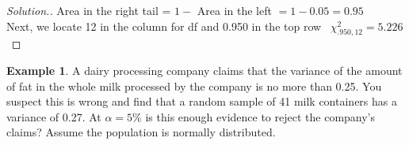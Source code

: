 \documentclass[11pt,a4paper]{article}
\theoremstyle{definition}
\newtheorem{example}[thm]{Example}
\newenvironment{solution}
  {\renewcommand{\qedsymbol}{}\begin{proof}[\textit{Solution}.]}
  {\end{proof}}
\begin{document}
\begin{solution}
Area in the right tail = $1 - $ Area in the left $= 1 - 0.05=0.95$\\

Next, we locate 12 in the column for df and 0.950 in the top row \ $\chi^2_{.950,12}=5.226$\\[1ex]
\end{solution}











\begin{example}
A dairy processing company claims that the variance of the amount of fat in the whole milk processed by the company is no more than 0.25. You suspect this is wrong and find that a random sample of 41 milk containers has a variance of 0.27. At $\alpha =5\%$ is this enough evidence to reject the company's claims? Assume the population is normally distributed.\\[1ex]
\end{example}
\end{document}
